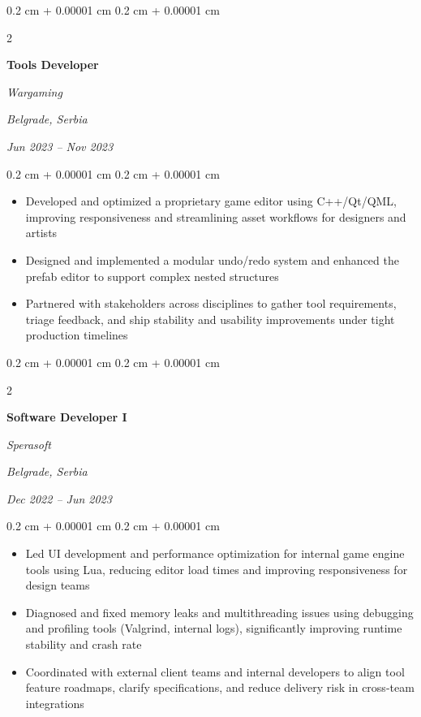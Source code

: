 \documentclass[10pt, letterpaper]{article}
\newenvironment{highlights}{
    \begin{itemize}[
        topsep=0.10 cm,
        parsep=0.10 cm,
        partopsep=0pt,
        itemsep=0pt,
        leftmargin=0.4 cm + 10pt
    ]
}{
    \end{itemize}
} %
\newenvironment{onecolentry}{
    \begin{adjustwidth}{
        0.2 cm + 0.00001 cm
    }{
        0.2 cm + 0.00001 cm
    }
}{
    \end{adjustwidth}
} %
\newenvironment{twocolentry}[2][]{
    \onecolentry
    \def\secondColumn{#2}
    \setcolumnwidth{\fill, 4.5 cm}
    \begin{paracol}{2}
}{
    \switchcolumn \raggedleft \secondColumn
    \end{paracol}
    \endonecolentry
} %
\begin{document}
        \vspace{0.2 cm}


\begin{twocolentry}{
        \textit{Belgrade, Serbia}    
            
        \textit{Jun 2023 – Nov 2023}}
            \textbf{Tools Developer}
            
            \textit{Wargaming}
        \end{twocolentry}

        \vspace{0.10 cm}
        \begin{onecolentry}
            \begin{highlights}
                \item Developed and optimized a proprietary game editor using C++/Qt/QML, improving responsiveness and streamlining asset workflows for designers and artists
                \item Designed and implemented a modular undo/redo system and enhanced the prefab editor to support complex nested structures
                \item Partnered with stakeholders across disciplines to gather tool requirements, triage feedback, and ship stability and usability improvements under tight production timelines
            \end{highlights}
        \end{onecolentry}


        \vspace{0.2 cm}
        
        \begin{twocolentry}{
        \textit{Belgrade, Serbia}    
            
        \textit{Dec 2022 – Jun 2023}}
            \textbf{Software Developer I}
            
            \textit{Sperasoft}
        \end{twocolentry}

        \vspace{0.10 cm}
        \begin{onecolentry}
            \begin{highlights}
                \item Led UI development and performance optimization for internal game engine tools using Lua, reducing editor load times and improving responsiveness for design teams
                \item Diagnosed and fixed memory leaks and multithreading issues using debugging and profiling tools (Valgrind, internal logs), significantly improving runtime stability and crash rate
                \item Coordinated with external client teams and internal developers to align tool feature roadmaps, clarify specifications, and reduce delivery risk in cross-team integrations
            \end{highlights}
        \end{onecolentry}
\end{document}
